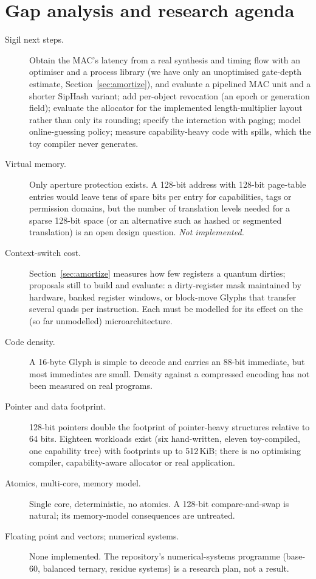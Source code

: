 \documentclass[10pt,a4paper]{article}
\begin{document}
\section{Gap analysis and research agenda}\label{sec:gaps}
\begin{description}
\item[Sigil next steps.] Obtain the MAC's latency from a real synthesis and timing flow with an optimiser and a process library (we have only an unoptimised gate-depth estimate, Section~\ref{sec:amortize}), and evaluate a pipelined MAC unit and a shorter SipHash variant; add per-object revocation (an epoch or generation field); evaluate the allocator for the implemented length-multiplier layout rather than only its rounding; specify the interaction with paging; model online-guessing policy; measure capability-heavy code with spills, which the toy compiler never generates.
\item[Virtual memory.] Only aperture protection exists. A 128-bit address with 128-bit page-table entries would leave tens of spare bits per entry for capabilities, tags or permission domains, but the number of translation levels needed for a sparse 128-bit space (or an alternative such as hashed or segmented translation) is an open design question. \emph{Not implemented.}
\item[Context-switch cost.] Section~\ref{sec:amortize} measures how few registers a quantum dirties; proposals still to build and evaluate: a dirty-register mask maintained by hardware, banked register windows, or block-move Glyphs that transfer several quads per instruction. Each must be modelled for its effect on the (so far unmodelled) microarchitecture.
\item[Code density.] A 16-byte Glyph is simple to decode and carries an 88-bit immediate, but most immediates are small. Density against a compressed encoding has not been measured on real programs.
\item[Pointer and data footprint.] 128-bit pointers double the footprint of pointer-heavy structures relative to 64 bits. Eighteen workloads exist (six hand-written, eleven toy-compiled, one capability tree) with footprints up to 512\,KiB; there is no optimising compiler, capability-aware allocator or real application.
\item[Atomics, multi-core, memory model.] Single core, deterministic, no atomics. A 128-bit compare-and-swap is natural; its memory-model consequences are untreated.
\item[Floating point and vectors; numerical systems.] None implemented. The repository's numerical-systems programme (base-60, balanced ternary, residue systems) is a research plan, not a result.

\end{description}
\end{document}
